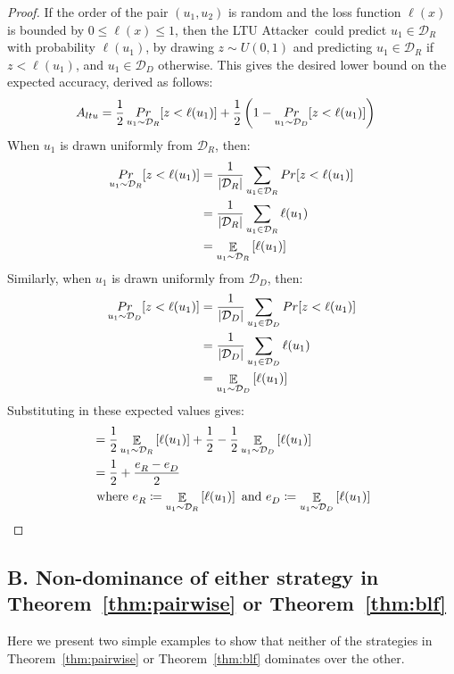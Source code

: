 \documentclass[letterpaper]{article}
\newcommand{\oracle}{LTU Attacker~}
\begin{document}
\begin{proof}
If the order of the pair $(u_1,u_2)$ is random and the loss function $\ell(x)$ is bounded by $0 \le \ell(x)\le 1$, then the \oracle could predict $u_1 \in \mathcal{D}_R$ with probability $\ell(u_1)$, by drawing $z \sim U(0,1)$ and predicting $u_1 \in \mathcal{D}_R$ if $z < \ell(u_1)$, and $u_1 \in \mathcal{D}_D$ otherwise. This gives the desired lower bound on the expected accuracy, derived as follows:
\begin{align}
A_{ltu} &= \frac{1}{2}\mathop{Pr}_{u_1 \sim \mathcal{D}_R}[z<\ell(u_1)] + \frac{1}{2}\left( 1 - \mathop{Pr}_{u_1 \sim \mathcal{D}_D}[z<\ell(u_1)]\right) \notag
\end{align}
When $u_1$ is drawn uniformly from $\mathcal{D}_R$, then:
\begin{align}
\mathop{Pr}_{u_1 \sim \mathcal{D}_R}[z<\ell(u_1)] &= \frac{1}{|\mathcal{D}_R|} \sum_{u_1 \in \mathcal{D}_R} \mathop{Pr}[z<\ell(u_1)] \notag \\
&= \frac{1}{|\mathcal{D}_R|} \sum_{u_1 \in \mathcal{D}_R} \ell(u_1) \notag \\
&= \mathop{\mathbb{E}}_{u_1 \sim \mathcal{D}_R}\left[\ell(u_1)\right]
\end{align}
Similarly, when $u_1$ is drawn uniformly from $\mathcal{D}_D$, then:
\begin{align}
\mathop{Pr}_{u_1 \sim \mathcal{D}_D}[z<\ell(u_1)] &= \frac{1}{|\mathcal{D}_D|} \sum_{u_1 \in \mathcal{D}_D} \mathop{Pr}[z<\ell(u_1)] \notag \\
&= \frac{1}{|\mathcal{D}_D|} \sum_{u_1 \in \mathcal{D}_D} \ell(u_1) \notag \\
&= \mathop{\mathbb{E}}_{u_1 \sim \mathcal{D}_D}\left[\ell(u_1)\right]
\end{align}
Substituting in these expected values gives:
\begin{align}
&= \frac{1}{2}\mathop{\mathbb{E}}_{u_1 \sim \mathcal{D}_R}\left[\ell(u_1)\right] + \frac{1}{2} - \frac{1}{2}\mathop{\mathbb{E}}_{u_1 \sim \mathcal{D}_D}\left[ \ell(u_1)\right] \notag \\
&= \frac{1}{2} + \frac{e^{}_R - e^{}_D}{2} \\
& \text{ where } e^{}_R \coloneqq \mathop{\mathbb{E}}_{u_1 \sim \mathcal{D}_R}\left[\ell(u_1)\right] \text{ and } e^{}_D \coloneqq \mathop{\mathbb{E}}_{u_1 \sim \mathcal{D}_D}\left[\ell(u_1)\right] \notag
\end{align}
\end{proof}

\subsection{B. Non-dominance of either strategy in Theorem~\ref{thm:pairwise} or Theorem~\ref{thm:blf}}
Here we present two simple examples to show that neither of the strategies in Theorem~\ref{thm:pairwise} or Theorem~\ref{thm:blf} dominates over the other.
\end{document}
